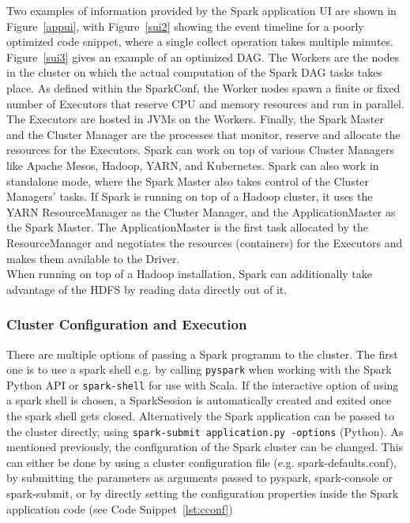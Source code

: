 \noindent Two examples of information provided by the Spark application UI are shown in Figure~\ref{appui}, with Figure~\ref{sui2} showing the event timeline for a poorly optimized code snippet, where a single collect operation takes multiple minutes. Figure~\ref{sui3} gives an example of an optimized DAG. %
\noindent The Workers are the nodes in the cluster on which the actual computation of the Spark DAG tasks takes place. As defined within the SparkConf, the Worker nodes spawn a finite or fixed number of Executors that reserve CPU and memory resources and run in parallel. The Executors are hosted in JVMs on the Workers. Finally, the Spark Master and the Cluster Manager are the processes that monitor, reserve and allocate the resources for the Executors. Spark can work on top of various Cluster Managers like Apache Mesos, Hadoop, YARN, and Kubernetes. Spark can also work in standalone mode, where the Spark Master also takes control of the Cluster Managers' tasks. If Spark is running on top of a Hadoop cluster, it uses the YARN ResourceManager as the Cluster Manager, and the ApplicationMaster as the Spark Master. The ApplicationMaster is the first task allocated by the ResourceManager and negotiates the resources (containers) for the Executors and makes them available to the Driver.~\cite[pp. 49 ff]{sparkbook1}\\
When running on top of a Hadoop installation, Spark can additionally take advantage of the HDFS by reading data directly out of it.\\

\subsubsection{Cluster Configuration and Execution}\label{cconfexp}


There are multiple options of passing a Spark programm to the cluster. The first one is to use a spark shell e.g. by calling \lstinline{pyspark} when working with the Spark Python API or \lstinline{spark-shell} for use with Scala. If the interactive option of using a spark shell is chosen, a SparkSession is automatically created and exited once the spark shell gets closed. 
Alternatively the Spark application can be passed to the cluster directly, using \lstinline{spark-submit application.py -options} (Python).
As mentioned previously, the configuration of the Spark cluster can be changed. This can either be done by using a cluster configuration file (e.g. spark-defaults.conf), by submitting the parameters as arguments passed to pyspark, spark-console or spark-submit, or by directly setting the configuration properties inside the Spark application code (see Code Snippet~\ref{lst:cconf})\\

